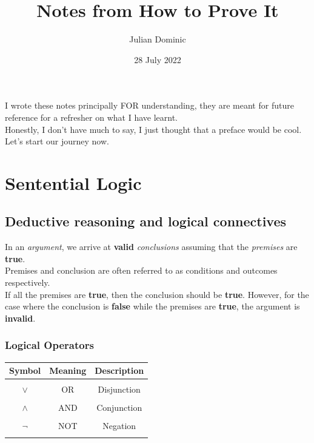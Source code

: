 \documentclass[../setup.tex]{subfiles}
\begin{document}
\title{Notes from How to Prove It}
\author{Julian Dominic}
\date{28 July 2022}
\maketitle
\clearpage

\newcommand{\prefacename}{Preface}
\newenvironment{preface}{
    {\noindent \bfseries \Huge \prefacename}
    \begin{center}
        \thispagestyle{plain}
    \end{center}%
}


\preface
I wrote these notes principally FOR understanding, they are meant for future reference for a refresher on what I have learnt. \\
Honestly, I don't have much to say, I just thought that a preface would be cool. Let's start our journey now.



\tableofcontents
{}
\clearpage

\setcounter{page}{1}



\section{Sentential Logic}
\subsection{Deductive reasoning and logical connectives}
In an \textit{argument}, we arrive at \textbf{valid} \textit{conclusions} assuming that the \textit{premises} are \textbf{true}. \\ 
Premises and conclusion are often referred to as conditions and outcomes respectively. \\
If all the premises are \textbf{true}, then the conclusion should be \textbf{true}. However, for the case where the conclusion is \textbf{false} while the premises are \textbf{true}, the argument is \textbf{invalid}.

\subsubsection{Logical Operators}
{
\centering
\begin{tabular}{| c | c | c |}
\hline
Symbol & Meaning & Description \\
\hline
& & \\
$\lor$ & OR & Disjunction \\
& & \\
$\land$ & AND & Conjunction \\
& & \\
$\lnot$ & NOT & Negation \\
& & \\
\hline
\end{tabular} \\
}
\end{document}
